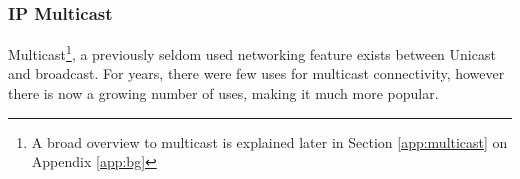 \subsubsection{IP Multicast}

Multicast\footnote{A broad overview to multicast is explained later in Section \ref{app:multicast} on Appendix \ref{app:bg}}, 
a previously seldom used networking feature exists between Unicast and 
broadcast. For years, there were few uses for multicast connectivity, 
however there is now a growing number of uses, making it much more 
popular. 


